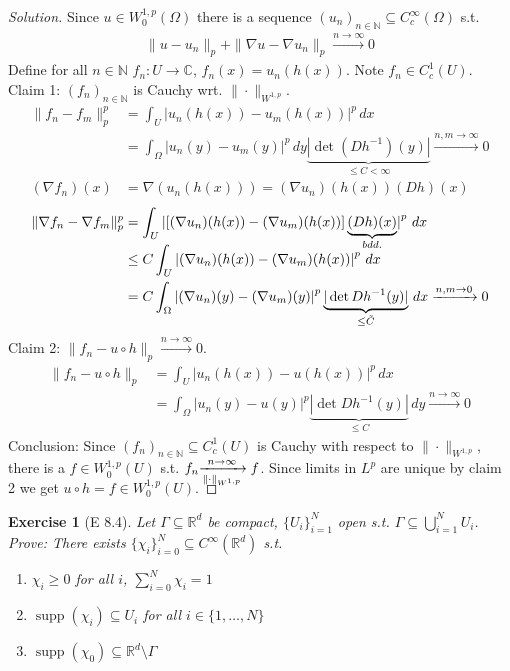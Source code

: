 \documentclass{report}
\theoremstyle{tommy}
\newtheorem{ex}[defn]{Exercise}
\newcommand{\supp}{\operatorname{supp}}
\begin{document}
  \begin{proof}[Solution]
    Since \(u \in W_0^{1,p}(\Omega)\) there is a sequence \((u_n)_{n \in \mathbb{N}} \subseteq C_c^\infty(\Omega)\) s.t. \begin{align*}
      \|u - u_n\|_p + \|\nabla u - \nabla u_n\|_p \xrightarrow{n \to \infty} 0
    \end{align*}
    Define for all \(n \in \mathbb{N}\) \(f_n: U \to \mathbb{C}\), \(f_n(x) = u_n(h(x))\). Note \(f_n \in C_c^1(U)\).
    Claim 1: \((f_n)_{n \in \mathbb{N}}\) is Cauchy wrt. \(\|\cdot\|_{W^{1,p}}\). \begin{align*}
      \|f_n - f_m\|_p^p &= \int_U |u_n(h(x)) - u_m(h(x))|^p \, dx \\
      &= \int_\Omega |u_n(y) - u_m(y)|^p \, dy \underbrace{|\det(Dh^{-1})(y)|}_{\le C < \infty} \xrightarrow{n,m \to \infty} 0 \\
      (\nabla f_n)(x) &= \nabla (u_n(h(x))) = (\nabla u_n) (h(x)) (Dh)(x)
    \end{align*}
    \begin{align*}
      \|\nabla f_n - \nabla f_m\|_p^p &= \int_U \left|\left[(\nabla u_n)(h(x)) - (\nabla u_m)(h(x))\right]\smash{\underbrace{(Dh)(x)}_{bdd.}}\right|^p \, dx \\
      &\le C \int_U \left| (\nabla u_n)(h(x)) - (\nabla u_m)(h(x)) \right|^p \, dx \\
      &= C \int_\Omega \left|(\nabla u_n)(y) - (\nabla u_m)(y)\right|^p \underbrace{|\det Dh^{-1}(y)|}_{\le \tilde C} \, dx
      \xrightarrow{n,m \to 0}0
    \end{align*}
    Claim 2: \(\|f_n - u \circ h\|_p \xrightarrow{n \to \infty} 0\).
    \begin{align*}
      \|f_n - u\circ h\|_p 
      &= \int_U |u_n(h(x)) - u(h(x))|^p \, dx \\
      &= \int_\Omega |u_n(y)- u(y)|^p \underbrace{|\det Dh^{-1}(y)|}_{\le C}\, dy \xrightarrow{n \to \infty} 0
    \end{align*}
    Conclusion: Since \((f_n)_{n \in \mathbb{N}} \subseteq C_c^1(U)\) is Cauchy with respect to \(\|\cdot\|_{W^{1,p}}\), there is a \(f \in W_0^{1,p}(U)\) s.t. \(f_n \smash{\xrightarrow[\|\cdot\|_{W^{1,p}}]{n \to \infty}f}\). Since limits in \(L^p\) are unique by claim 2 we get \(u \circ h = f \in W_0^{1,p}(U)\).
  \end{proof}

  \begin{ex}[E 8.4]
    Let \(\Gamma \subseteq \mathbb{R}^d\) be compact, \(\{U_i\}_{i=1}^N\) open s.t. \(\Gamma \subseteq \bigcup_{i=1}^N U_i\). Prove: There exists \(\{\chi_i\}_{i=0}^N \subseteq C^\infty(\mathbb{R}^d)\) s.t. \begin{enumerate}
      \item \(\chi_i \ge 0\) for all \(i\), \(\sum_{i=0}^N \chi_i = 1\) 
      \item \(\supp(\chi_i) \subseteq U_i\) for all \(i \in \{1, \dots, N\}\)
      \item \(\supp(\chi_0) \subseteq \mathbb{R}^d \setminus \Gamma\)
    \end{enumerate}
  \end{ex}
\end{document}
